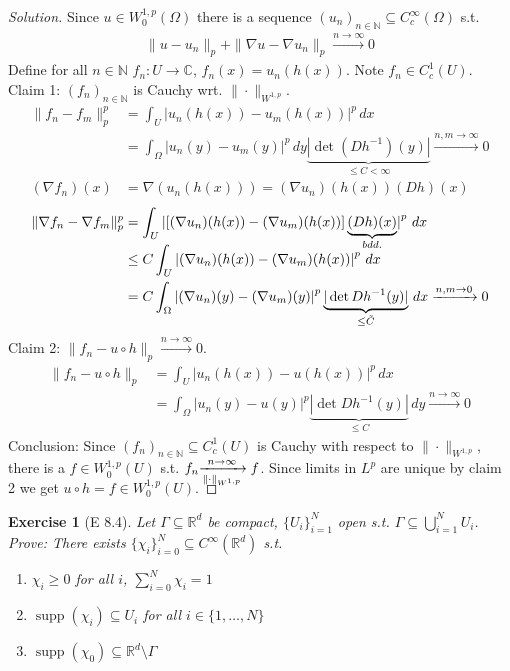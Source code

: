 \documentclass{report}
\theoremstyle{tommy}
\newtheorem{ex}[defn]{Exercise}
\newcommand{\supp}{\operatorname{supp}}
\begin{document}
  \begin{proof}[Solution]
    Since \(u \in W_0^{1,p}(\Omega)\) there is a sequence \((u_n)_{n \in \mathbb{N}} \subseteq C_c^\infty(\Omega)\) s.t. \begin{align*}
      \|u - u_n\|_p + \|\nabla u - \nabla u_n\|_p \xrightarrow{n \to \infty} 0
    \end{align*}
    Define for all \(n \in \mathbb{N}\) \(f_n: U \to \mathbb{C}\), \(f_n(x) = u_n(h(x))\). Note \(f_n \in C_c^1(U)\).
    Claim 1: \((f_n)_{n \in \mathbb{N}}\) is Cauchy wrt. \(\|\cdot\|_{W^{1,p}}\). \begin{align*}
      \|f_n - f_m\|_p^p &= \int_U |u_n(h(x)) - u_m(h(x))|^p \, dx \\
      &= \int_\Omega |u_n(y) - u_m(y)|^p \, dy \underbrace{|\det(Dh^{-1})(y)|}_{\le C < \infty} \xrightarrow{n,m \to \infty} 0 \\
      (\nabla f_n)(x) &= \nabla (u_n(h(x))) = (\nabla u_n) (h(x)) (Dh)(x)
    \end{align*}
    \begin{align*}
      \|\nabla f_n - \nabla f_m\|_p^p &= \int_U \left|\left[(\nabla u_n)(h(x)) - (\nabla u_m)(h(x))\right]\smash{\underbrace{(Dh)(x)}_{bdd.}}\right|^p \, dx \\
      &\le C \int_U \left| (\nabla u_n)(h(x)) - (\nabla u_m)(h(x)) \right|^p \, dx \\
      &= C \int_\Omega \left|(\nabla u_n)(y) - (\nabla u_m)(y)\right|^p \underbrace{|\det Dh^{-1}(y)|}_{\le \tilde C} \, dx
      \xrightarrow{n,m \to 0}0
    \end{align*}
    Claim 2: \(\|f_n - u \circ h\|_p \xrightarrow{n \to \infty} 0\).
    \begin{align*}
      \|f_n - u\circ h\|_p 
      &= \int_U |u_n(h(x)) - u(h(x))|^p \, dx \\
      &= \int_\Omega |u_n(y)- u(y)|^p \underbrace{|\det Dh^{-1}(y)|}_{\le C}\, dy \xrightarrow{n \to \infty} 0
    \end{align*}
    Conclusion: Since \((f_n)_{n \in \mathbb{N}} \subseteq C_c^1(U)\) is Cauchy with respect to \(\|\cdot\|_{W^{1,p}}\), there is a \(f \in W_0^{1,p}(U)\) s.t. \(f_n \smash{\xrightarrow[\|\cdot\|_{W^{1,p}}]{n \to \infty}f}\). Since limits in \(L^p\) are unique by claim 2 we get \(u \circ h = f \in W_0^{1,p}(U)\).
  \end{proof}

  \begin{ex}[E 8.4]
    Let \(\Gamma \subseteq \mathbb{R}^d\) be compact, \(\{U_i\}_{i=1}^N\) open s.t. \(\Gamma \subseteq \bigcup_{i=1}^N U_i\). Prove: There exists \(\{\chi_i\}_{i=0}^N \subseteq C^\infty(\mathbb{R}^d)\) s.t. \begin{enumerate}
      \item \(\chi_i \ge 0\) for all \(i\), \(\sum_{i=0}^N \chi_i = 1\) 
      \item \(\supp(\chi_i) \subseteq U_i\) for all \(i \in \{1, \dots, N\}\)
      \item \(\supp(\chi_0) \subseteq \mathbb{R}^d \setminus \Gamma\)
    \end{enumerate}
  \end{ex}
\end{document}
